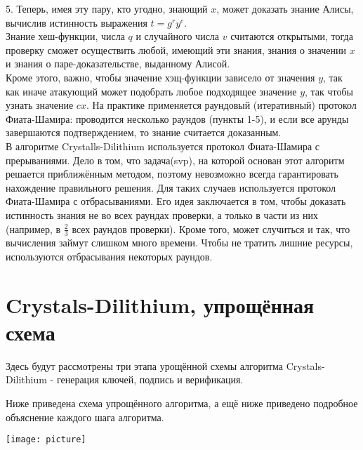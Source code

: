\documentclass{article}
\begin{document}
	5. Теперь, имея эту пару, кто угодно, знающий $x$, может доказать знание Алисы, вычислив истинность выражения $t=g^ry^c$.\\
	
	Знание хеш-функции, числа $q$ и случайного числа $v$ считаются открытыми, тогда проверку сможет осуществить любой, имеющий эти знания, знания о значении $x$ и знания о паре-доказательстве, выданному Алисой.\\
	Кроме этого, важно, чтобы значение хэщ-функции зависело от значения $y$, так как иначе атакующий может подобрать любое подходящее значение $y$, так чтобы узнать значение $cx$. На практике применяется раундовый (итеративный) протокол Фиата-Шамира: проводится несколько раундов (пункты 1-5), и если все арунды завершаются подтверждением, то знание считается доказанным.
	\\
	В алгоритме Crystalls-Dilithium используется протокол Фиата-Шамира с прерываниями. Дело в том, что задача(svp), на которой основан этот алгоритм решается приближённым методом, поэтому невозможно всегда гарантировать нахождение правильного решения. Для таких случаев используется протокол Фиата-Шамира с отбрасываниями. Его идея заключается в том, чтобы доказать истинность знания не во всех раундах проверки, а только в части из них (например, в $\frac{2}{3}$ всех раундов проверки). Кроме того, может случиться и так, что вычисления займут слишком много времени. Чтобы не тратить лишние ресурсы, используются отбрасывания некоторых раундов. 


\section{Crystals-Dilithium, упрощённая схема
}
	
	Здесь будут рассмотрены три этапа урощённой схемы алгоритма Crystals-Dilithium - генерация ключей, подпись и верификация.
	
	Ниже приведена схема упрощённого алгоритма, а ещё ниже приведено подробное объяснение каждого шага алгоритма.
	
	\texttt{[image: picture]}
	
\end{document}
